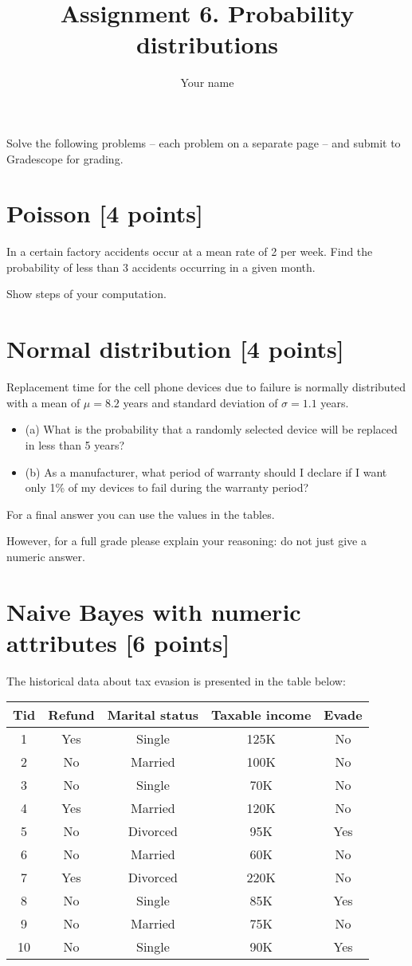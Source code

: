 \documentclass{article}
\title{Assignment 6. Probability distributions}
\author{Your name}
\begin{document}
\maketitle


Solve the following problems -- each problem on a separate page -- and submit to Gradescope for grading. 

\newpage
\section{Poisson [4 points]}
In a certain factory accidents occur at a mean rate of 2 per week. Find the probability of less than 3 accidents occurring in a given month.


Show steps of your computation.

\newpage
\section{Normal distribution [4 points]}
Replacement time for the cell phone devices due to failure is normally distributed with a mean of $\mu=8.2$ years and standard deviation of $\sigma = 1.1$ years. 
\begin{itemize}
    \item (a) What is the probability that a randomly selected device will be replaced in less than 5 years?
    \item (b) As a manufacturer, what period of warranty should I declare if I want only 1\% of my devices to fail during the warranty period?
\end{itemize}


For a final answer you can use the values in the tables.

However, for a full grade please explain your reasoning: do not just give a numeric answer. 

\newpage
\section{Naive Bayes with numeric attributes [6 points]}
The historical data about tax evasion is presented in the table below:
\begin{center}
\begin{tabular}{ |c|c|c|c|c| } 
 \hline
Tid & Refund & Marital status & Taxable income & Evade \\
 \hline
1 & Yes & Single & 125K & No \\
2 & No & Married & 100K & No \\ 
3 & No & Single & 70K & No \\ 
4 & Yes & Married & 120K & No \\ 
5 & No & Divorced & 95K & Yes \\ 
6 & No & Married & 60K & No \\ 
7 & Yes & Divorced & 220K & No \\ 
8 & No & Single & 85K & Yes \\ 
9 & No & Married & 75K & No \\ 
10 & No & Single & 90K & Yes \\ 
 \hline
\end{tabular}
\end{center}
\end{document}
